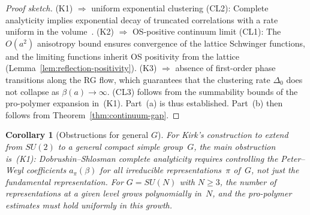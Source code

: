 \documentclass[12pt,a4paper]{article}
\theoremstyle{definition}
\theoremstyle{plain}
\newtheorem{corollary}[definition]{Corollary}
\theoremstyle{remark}
\begin{document}
\begin{proof}[Proof sketch]
(K1) $\Rightarrow$ uniform exponential clustering (CL2): Complete analyticity
implies exponential decay of truncated correlations with a rate uniform
in the volume~\cite{DobrushinShlosman1985}. (K2) $\Rightarrow$ OS-positive continuum limit (CL1):
The $O(a^2)$ anisotropy bound ensures convergence of the lattice Schwinger functions,
and the limiting functions inherit OS positivity from the lattice
(Lemma~\ref{lem:reflection-positivity}). (K3) $\Rightarrow$ absence of
first-order phase transitions along the RG flow, which guarantees that the
clustering rate $\Delta_0$ does not collapse as $\beta(a) \to \infty$. (CL3) follows
from the summability bounds of the pro-polymer expansion in~(K1). Part~(a) is
thus established. Part~(b) then follows from Theorem~\ref{thm:continuum-gap}.
\end{proof}

\begin{corollary}[Obstructions for general $G$]
For Kirk's construction to extend from $SU(2)$ to a general compact simple
group~$G$, the main obstruction is~\textup{(K1)}: Dobrushin--Shlosman complete
analyticity requires controlling the Peter--Weyl coefficients $a_\pi(\beta)$
for \emph{all} irreducible representations~$\pi$ of~$G$, not just the
fundamental representation. For $G = SU(N)$ with $N \geq 3$, the number of
representations at a given level grows polynomially in~$N$, and the
pro-polymer estimates must hold uniformly in this growth.
\end{corollary}
\end{document}
